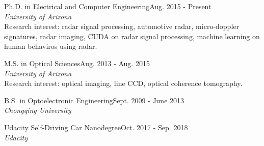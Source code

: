 \documentclass[letterpaper,9pt]{article}
\renewenvironment{itemize}{
  \begin{list}{}{
    \setlength{\topsep}{0pt}
    \setlength{\itemsep}{0pt}
    \setlength{\parsep}{0pt}
    \setlength{\partopsep}{0pt}
    \setlength{\leftmargin}{1.5em}
  }
}{\end{list}}
\begin{document}
\begin{itemize}
  \setlength{\itemsep}{1em}
  \item Ph.D. in Electrical and Computer Engineering\hfill Aug. 2015 - Present\\ {\it University of Arizona}\\Research interest: radar signal processing, automotive radar, micro-doppler signatures, radar imaging, CUDA on radar signal processing, machine learning on human behaviros using radar.
  \item M.S. in Optical Sciences\hfill Aug. 2013 - Aug. 2015\\ {\it University of Arizona}\\Research interest: optical imaging, line CCD, optical coherence tomography.
  \item B.S. in Optoelectronic Engineering\hfill Sept. 2009 - June 2013\\ {\it Chongqing University}
  \item Udacity Self-Driving Car Nanodegree\hfill Oct. 2017 - Sep. 2018\\ {\it Udacity}
\end{itemize}



\bigskip
\end{document}
